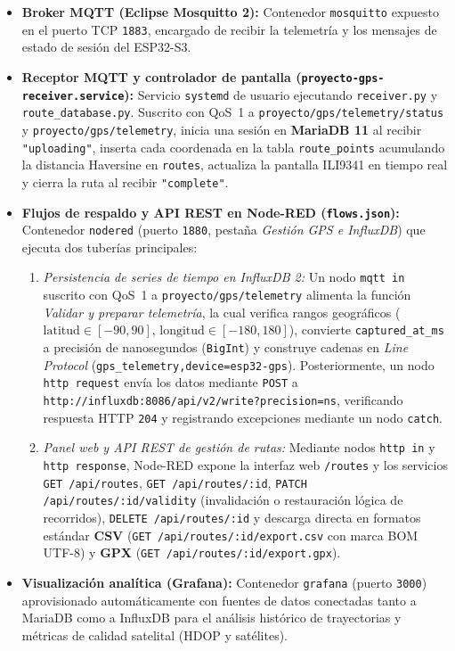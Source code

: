 \documentclass[12pt, letterpaper]{article}
\begin{document}
\begin{itemize}
    \item \textbf{Broker MQTT (Eclipse Mosquitto 2):} Contenedor \texttt{mosquitto} expuesto en el puerto TCP \texttt{1883}, encargado de recibir la telemetría y los mensajes de estado de sesión del ESP32-S3.
    \item \textbf{Receptor MQTT y controlador de pantalla (\texttt{proyecto-gps-receiver.service}):} Servicio \texttt{systemd} de usuario ejecutando \texttt{receiver.py} y \texttt{route\_database.py}. Suscrito con QoS~1 a \texttt{proyecto/gps/telemetry/status} y \texttt{proyecto/gps/telemetry}, inicia una sesión en \textbf{MariaDB 11} al recibir \texttt{"uploading"}, inserta cada coordenada en la tabla \texttt{route\_points} acumulando la distancia Haversine en \texttt{routes}, actualiza la pantalla ILI9341 en tiempo real y cierra la ruta al recibir \texttt{"complete"}.
    \item \textbf{Flujos de respaldo y API REST en Node-RED (\texttt{flows.json}):} Contenedor \texttt{nodered} (puerto \texttt{1880}, pestaña \textit{Gestión GPS e InfluxDB}) que ejecuta dos tuberías principales:
    \begin{enumerate}
        \item \emph{Persistencia de series de tiempo en InfluxDB 2:} Un nodo \texttt{mqtt in} suscrito con QoS~1 a \texttt{proyecto/gps/telemetry} alimenta la función \textit{Validar y preparar telemetría}, la cual verifica rangos geográficos ($\text{latitud} \in [-90, 90]$, $\text{longitud} \in [-180, 180]$), convierte \texttt{captured\_at\_ms} a precisión de nanosegundos (\texttt{BigInt}) y construye cadenas en \textit{Line Protocol} (\texttt{gps\_telemetry,device=esp32-gps}). Posteriormente, un nodo \texttt{http request} envía los datos mediante \texttt{POST} a \texttt{http://influxdb:8086/api/v2/write?precision=ns}, verificando respuesta HTTP \texttt{204} y registrando excepciones mediante un nodo \texttt{catch}.
        \item \emph{Panel web y API REST de gestión de rutas:} Mediante nodos \texttt{http in} y \texttt{http response}, Node-RED expone la interfaz web \texttt{/routes} y los servicios \texttt{GET /api/routes}, \texttt{GET /api/routes/:id}, \texttt{PATCH /api/routes/:id/validity} (invalidación o restauración lógica de recorridos), \texttt{DELETE /api/routes/:id} y descarga directa en formatos estándar \textbf{CSV} (\texttt{GET /api/routes/:id/export.csv} con marca BOM UTF-8) y \textbf{GPX} (\texttt{GET /api/routes/:id/export.gpx}).
    \end{enumerate}
    \item \textbf{Visualización analítica (Grafana):} Contenedor \texttt{grafana} (puerto \texttt{3000}) aprovisionado automáticamente con fuentes de datos conectadas tanto a MariaDB como a InfluxDB para el análisis histórico de trayectorias y métricas de calidad satelital (HDOP y satélites).
\end{itemize}
\end{document}
